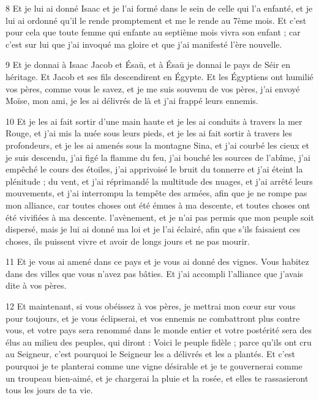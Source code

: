 \par 8 Et je lui ai donné Isaac et je l'ai formé dans le sein de celle qui l'a enfanté, et je lui ai ordonné qu'il le rende promptement et me le rende au 7ème mois. Et c’est pour cela que toute femme qui enfante au septième mois vivra son enfant ; car c’est sur lui que j’ai invoqué ma gloire et que j’ai manifesté l’ère nouvelle.

\par 9 Et je donnai à Isaac Jacob et Ésaü, et à Ésaü je donnai le pays de Séir en héritage. Et Jacob et ses fils descendirent en Égypte. Et les Égyptiens ont humilié vos pères, comme vous le savez, et je me suis souvenu de vos pères, j'ai envoyé Moïse, mon ami, je les ai délivrés de là et j'ai frappé leurs ennemis.

\par 10 Et je les ai fait sortir d'une main haute et je les ai conduits à travers la mer Rouge, et j'ai mis la nuée sous leurs pieds, et je les ai fait sortir à travers les profondeurs, et je les ai amenés sous la montagne Sina, et j'ai courbé les cieux et je suis descendu, j'ai figé la flamme du feu, j'ai bouché les sources de l'abîme, j'ai empêché le cours des étoiles, j'ai apprivoisé le bruit du tonnerre et j'ai éteint la plénitude ; du vent, et j'ai réprimandé la multitude des nuages, et j'ai arrêté leurs mouvements, et j'ai interrompu la tempête des armées, afin que je ne rompe pas mon alliance, car toutes choses ont été émues à ma descente, et toutes choses ont été vivifiées à ma descente. l'avènement, et je n'ai pas permis que mon peuple soit dispersé, mais je lui ai donné ma loi et je l'ai éclairé, afin que s'ils faisaient ces choses, ils puissent vivre et avoir de longs jours et ne pas mourir.

\par 11 Et je vous ai amené dans ce pays et je vous ai donné des vignes. Vous habitez dans des villes que vous n'avez pas bâties. Et j'ai accompli l'alliance que j'avais dite à vos pères.

\par 12 Et maintenant, si vous obéissez à vos pères, je mettrai mon cœur sur vous pour toujours, et je vous éclipserai, et vos ennemis ne combattront plus contre vous, et votre pays sera renommé dans le monde entier et votre postérité sera des élus au milieu des peuples, qui diront : Voici le peuple fidèle ; parce qu'ils ont cru au Seigneur, c'est pourquoi le Seigneur les a délivrés et les a plantés. Et c'est pourquoi je te planterai comme une vigne désirable et je te gouvernerai comme un troupeau bien-aimé, et je chargerai la pluie et la rosée, et elles te rassasieront tous les jours de ta vie.

